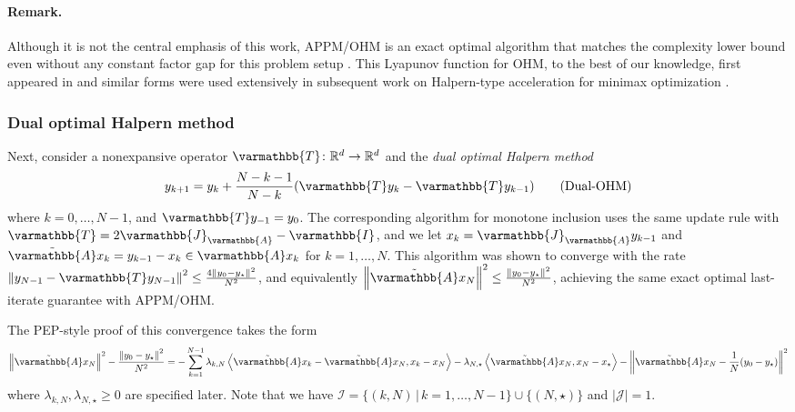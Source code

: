 \documentclass{article}
\theoremstyle{definition}
\theoremstyle{plain}
\newcommand{\cI}{{\mathcal{I}}}
\newcommand{\cJ}{{\mathcal{J}}}
\newcommand{\reals}{\mathbb{R}}
\newcommand{\opA}{{\varmathbb{A}}}
\newcommand{\opI}{{\varmathbb{I}}}
\newcommand{\opJ}{{\varmathbb{J}}}
\newcommand{\opT}{{\varmathbb{T}}}
\newcommand{\inprod}[2]{\left\langle #1,#2 \right\rangle}
\newcommand{\sqnorm}[1]{\left\| #1 \right\|^2}
\newcommand{\topa}{\tilde{\opA}}
\begin{document}
\paragraph{Remark.}
Although it is not the central emphasis of this work, APPM/OHM is an exact optimal algorithm that matches the complexity lower bound even without any constant factor gap for this problem setup \citep{ParkRyu2022_exact}.
This Lyapunov function for OHM, to the best of our knowledge, first appeared in \citep{Diakonikolas2020_halpern} and similar forms were used extensively in subsequent work on Halpern-type acceleration for minimax optimization \citep{YoonRyu2021_accelerated,LeeKim2021_fast,Tran-DinhLuo2021_halperntype,RyuYin2022_largescale,yoonAcceleratedMinimaxAlgorithms2025}.

\subsubsection{Dual optimal Halpern method}
\label{section:dual-ohm}

Next, consider a nonexpansive operator $\opT\colon \reals^d \to \reals^d$ and the \emph{dual optimal Halpern method} \citep{YoonKimSuhRyu2024_optimal}
\begin{align}
    y_{k+1} = y_k + \frac{N-k-1}{N-k} (\opT y_k - \opT y_{k-1}) 
\label{alg:dual-ohm}
\tag{Dual-OHM}
\end{align}
where $k=0,\dots,N-1$, and $\opT y_{-1} = y_0$. 
The corresponding algorithm for monotone inclusion uses the same update rule with $\opT = 2\opJ_\opA - \opI$, and we let $x_k = \opJ_\opA y_{k-1}$ and $\topa x_k = y_{k-1} - x_k \in \opA x_k$ for $k=1,\dots,N$.
This algorithm was shown to converge with the rate $\sqnorm{y_{N-1} - \opT y_{N-1}} \le \frac{4\sqnorm{y_0 - y_\star}}{N^2}$,
and equivalently $\sqnorm{\topa x_N} \le \frac{\sqnorm{y_0 - y_\star}}{N^2}$, achieving the same exact optimal last-iterate guarantee with APPM/OHM.

The PEP-style proof of this convergence takes the form
\begin{align*}
    \sqnorm{\topa  x_N} - \frac{\sqnorm{y_0 - y_\star}}{N^2} = -\sum_{k=1}^{N-1} \lambda_{k,N} \inprod{\topa x_{k} - \topa x_N}{x_k - x_N} - \lambda_{N,\star} \inprod{\topa x_N}{x_N - x_\star} - \sqnorm{\topa x_N - \frac{1}{N}(y_0 - y_\star)} 
\end{align*}
where $\lambda_{k,N}, \lambda_{N,\star} \ge 0$ are specified later.
Note that we have $\cI = \{(k,N)\,|\,k=1,\dots,N-1\} \cup \{(N,\star)\}$ and $|\cJ| = 1$. 
\end{document}
